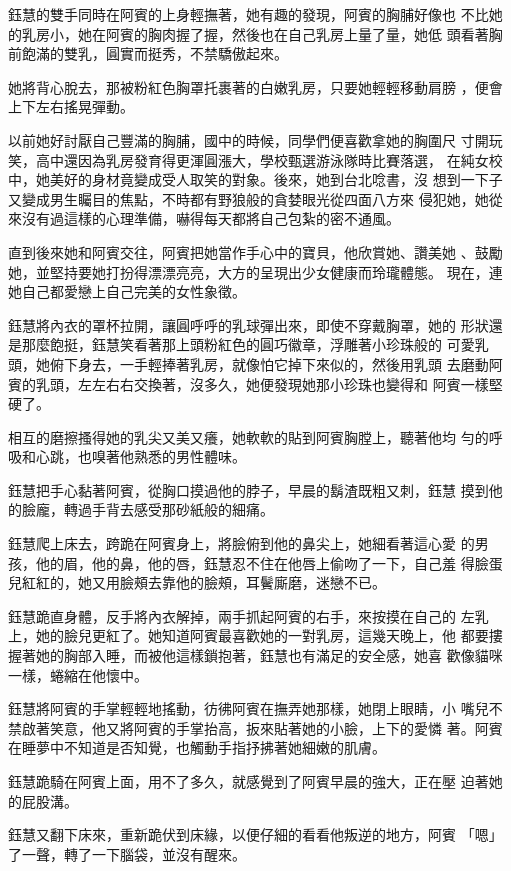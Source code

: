 鈺慧的雙手同時在阿賓的上身輕撫著，她有趣的發現，阿賓的胸脯好像也
不比她的乳房小，她在阿賓的胸肉握了握，然後也在自己乳房上量了量，她低
頭看著胸前飽滿的雙乳，圓實而挺秀，不禁驕傲起來。

她將背心脫去，那被粉紅色胸罩托裹著的白嫩乳房，只要她輕輕移動肩膀
，便會上下左右搖晃彈動。

以前她好討厭自己豐滿的胸脯，國中的時候，同學們便喜歡拿她的胸圍尺
寸開玩笑，高中還因為乳房發育得更渾圓漲大，學校甄選游泳隊時比賽落選，
在純女校中，她美好的身材竟變成受人取笑的對象。後來，她到台北唸書，沒
想到一下子又變成男生矚目的焦點，不時都有野狼般的貪婪眼光從四面八方來
侵犯她，她從來沒有過這樣的心理準備，嚇得每天都將自己包紮的密不通風。

直到後來她和阿賓交往，阿賓把她當作手心中的寶貝，他欣賞她、讚美她
、鼓勵她，並堅持要她打扮得漂漂亮亮，大方的呈現出少女健康而玲瓏體態。
現在，連她自己都愛戀上自己完美的女性象徵。

鈺慧將內衣的罩杯拉開，讓圓呼呼的乳球彈出來，即使不穿戴胸罩，她的
形狀還是那麼飽挺，鈺慧笑看著那上頭粉紅色的圓巧徽章，浮雕著小珍珠般的
可愛乳頭，她俯下身去，一手輕捧著乳房，就像怕它掉下來似的，然後用乳頭
去磨動阿賓的乳頭，左左右右交換著，沒多久，她便發現她那小珍珠也變得和
阿賓一樣堅硬了。

相互的磨擦搔得她的乳尖又美又癢，她軟軟的貼到阿賓胸膛上，聽著他均
勻的呼吸和心跳，也嗅著他熟悉的男性體味。

鈺慧把手心黏著阿賓，從胸口摸過他的脖子，早晨的鬍渣既粗又刺，鈺慧
摸到他的臉龐，轉過手背去感受那砂紙般的細痛。

鈺慧爬上床去，跨跪在阿賓身上，將臉俯到他的鼻尖上，她細看著這心愛
的男孩，他的眉，他的鼻，他的唇，鈺慧忍不住在他唇上偷吻了一下，自己羞
得臉蛋兒紅紅的，她又用臉頰去靠他的臉頰，耳鬢廝磨，迷戀不已。

鈺慧跪直身體，反手將內衣解掉，兩手抓起阿賓的右手，來按摸在自己的
左乳上，她的臉兒更紅了。她知道阿賓最喜歡她的一對乳房，這幾天晚上，他
都要摟握著她的胸部入睡，而被他這樣鎖抱著，鈺慧也有滿足的安全感，她喜
歡像貓咪一樣，蜷縮在他懷中。

鈺慧將阿賓的手掌輕輕地搖動，彷彿阿賓在撫弄她那樣，她閉上眼睛，小
嘴兒不禁啟著笑意，他又將阿賓的手掌抬高，扳來貼著她的小臉，上下的愛憐
著。阿賓在睡夢中不知道是否知覺，也觸動手指抒拂著她細嫩的肌膚。

鈺慧跪騎在阿賓上面，用不了多久，就感覺到了阿賓早晨的強大，正在壓
迫著她的屁股溝。

鈺慧又翻下床來，重新跪伏到床緣，以便仔細的看看他叛逆的地方，阿賓
「嗯」了一聲，轉了一下腦袋，並沒有醒來。


